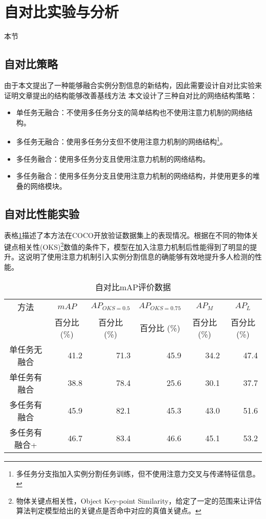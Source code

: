 \section{自对比实验与分析}
\label{sec:ablation}
本节
\subsection{自对比策略}
\label{subsec:selfstrategy}
由于本文提出了一种能够融合实例分割信息的新结构，因此需要设计自对比实验来证明文章提出的结构能够改善基线方法
本文设计了三种自对比的网络结构策略：
\begin{itemize}
	\item 单任务无融合：不使用多任务分支的简单结构也不使用注意力机制的网络结构。
	\item 多任务无融合：使用多任务分支但不使用注意力机制的网络结构\footnote{多任务分支指加入实例分割任务训练，但不使用注意力交叉与传递特征信息。}。
	\item 多任务融合：使用多任务分支且使用注意力机制的网络结构。
	\item 多任务融合：使用多任务分支且使用注意力机制的网络结构，并使用更多的堆叠的网络模块。
\end{itemize}

\subsection{自对比性能实验}
\label{subsec:selfeval}

表格\ref{tab:mAPCOCOselfbenchmark}描述了本方法在COCO开放验证数据集上的表现情况。根据在不同的物体关键点相关性(OKS)\footnote{物体关键点相关性，Object Key-point Similarity，给定了一定的范围来让评估算法判定模型给出的关键点是否命中对应的真值关键点。}数值的条件下，模型在加入注意力机制后性能得到了明显的提升。这说明了使用注意力机制引入实例分割信息的确能够有效地提升多人检测的性能。

\begin{longtable}[c]{c*{5}{r}}
	\caption{自对比mAP评价数据}
	\label{tab:mAPCOCOselfbenchmark}\\
	\toprule[1.5pt]
	方法 & \multicolumn{1}{c}{$mAP$} & \multicolumn{1}{c}{$AP_{OKS=0.5}$} & \multicolumn{1}{c}{$AP_{OKS=0.75}$} 
	& \multicolumn{1}{c}{$AP_M$} & \multicolumn{1}{c}{$AP_L$} \\
	
	& \multicolumn{1}{c}{百分比 (\%)}& \multicolumn{1}{c}{百分比 (\%)}&
	\multicolumn{1}{c}{百分比 (\%)}& \multicolumn{1}{c}{百分比 (\%)}& \multicolumn{1}{c}{
		百分比 (\%)}\\ \midrule[1pt]
	\endhead
	\endlastfoot
	单任务无融合 & 41.2 & 71.3 & 45.9& 34.2& 47.4\\
	单任务有融合 & 38.8 & 78.4 & 25.6 & 30.1 & 37.7 \\
	多任务有融合 & 45.9 & 82.1 & 45.3 & 43.0 & 51.6 \\
	多任务有融合+ & 46.7 & 83.4 & 46.6 & 45.1 & 53.2 \\
	\bottomrule[1.5pt]
\end{longtable}


